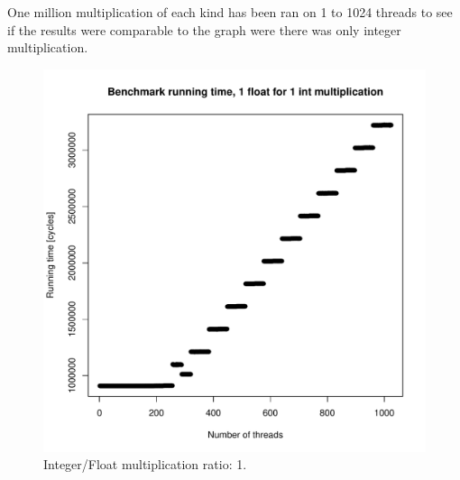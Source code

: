 \documentclass{report}
\def \scalingfactor{.8}
\begin{document}
	One million multiplication of each kind has been ran on 1 to 1024 threads to
    see if the results were comparable to the graph were there was only integer multiplication.
	\begin{figure}[H]
		\centering
		\vspace{-20pt}
    			\includegraphics[width=\scalingfactor\linewidth]{"graphics/running_times_ratio11"}
		\vspace{-15pt}
		\captionsetup{justification=centering}
		\caption{Integer/Float multiplication ratio: 1.}
	\end{figure}
	\pagebreak
\end{document}
